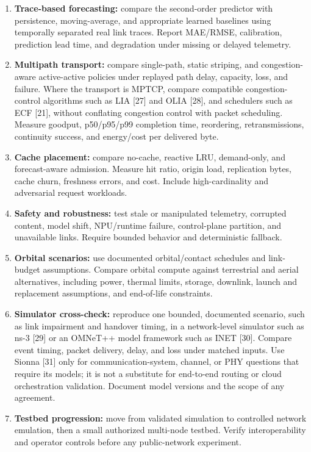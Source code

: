 \documentclass[
  american,
  11pt,
]{article}
\providecommand{\tightlist}{%
  \setlength{\itemsep}{0pt}\setlength{\parskip}{0pt}}
\begin{document}
\begin{enumerate}
\def\labelenumi{\arabic{enumi}.}
\tightlist
\item
  \textbf{Trace-based forecasting:} compare the second-order predictor
  with persistence, moving-average, and appropriate learned baselines
  using temporally separated real link traces. Report MAE/RMSE,
  calibration, prediction lead time, and degradation under missing or
  delayed telemetry.
\item
  \textbf{Multipath transport:} compare single-path, static striping,
  and congestion-aware active-active policies under replayed path delay,
  capacity, loss, and failure. Where the transport is MPTCP, compare
  compatible congestion-control algorithms such as LIA {[}27{]} and OLIA
  {[}28{]}, and schedulers such as ECF {[}21{]}, without conflating
  congestion control with packet scheduling. Measure goodput,
  p50/p95/p99 completion time, reordering, retransmissions, continuity
  success, and energy/cost per delivered byte.
\item
  \textbf{Cache placement:} compare no-cache, reactive LRU, demand-only,
  and forecast-aware admission. Measure hit ratio, origin load,
  replication bytes, cache churn, freshness errors, and cost. Include
  high-cardinality and adversarial request workloads.
\item
  \textbf{Safety and robustness:} test stale or manipulated telemetry,
  corrupted content, model shift, NPU/runtime failure, control-plane
  partition, and unavailable links. Require bounded behavior and
  deterministic fallback.
\item
  \textbf{Orbital scenarios:} use documented orbital/contact schedules
  and link-budget assumptions. Compare orbital compute against
  terrestrial and aerial alternatives, including power, thermal limits,
  storage, downlink, launch and replacement assumptions, and end-of-life
  constraints.
\item
  \textbf{Simulator cross-check:} reproduce one bounded, documented
  scenario, such as link impairment and handover timing, in a
  network-level simulator such as ns-3 {[}29{]} or an OMNeT++ model
  framework such as INET {[}30{]}. Compare event timing, packet
  delivery, delay, and loss under matched inputs. Use Sionna {[}31{]}
  only for communication-system, channel, or PHY questions that require
  its models; it is not a substitute for end-to-end routing or cloud
  orchestration validation. Document model versions and the scope of any
  agreement.
\item
  \textbf{Testbed progression:} move from validated simulation to
  controlled network emulation, then a small authorized multi-node
  testbed. Verify interoperability and operator controls before any
  public-network experiment.
\end{enumerate}
\end{document}
